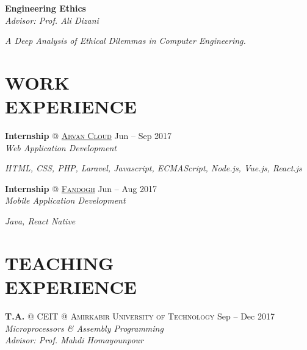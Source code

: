 \documentclass[margin, 10pt]{res} %
\begin{document}
\begin{resume}
\begin{innerlist}
			\end{innerlist}

        \textbf{Engineering Ethics}\\
		\textit{Advisor: Prof. Ali Dizani}
		\begin{innerlist}
			\item \textit{A Deep Analysis of Ethical Dilemmas in Computer Engineering.} \href{https://www.dropbox.com/s/hysshvi811nqwm4/Release_1_0_0.pdf?dl=0}{\hfill\UrlFont[docs]}
			
		\end{innerlist}
		
    
    \section{WORK \\ EXPERIENCE}
	\textbf{Internship} \textsc{@}
	\href{https://www.arvancloud.com/}{\textsc{Arvan Cloud}}
	\hfill {Jun -- Sep 2017}\\
	\textit{Web Application Development}
	\begin{innerlist}
		\item \textit{HTML, CSS, PHP, Laravel, Javascript, ECMAScript, Node.js, Vue.js, React.js}
	\end{innerlist}
	
	\textbf{Internship} \textsc{@}
	\href{http://www.fandogh.org/}{\textsc{Fandogh}}
	\hfill {Jun -- Aug 2017}\\
	\textit{Mobile Application Development}
	\begin{innerlist}
		\item \textit{Java, React Native}
	\end{innerlist}

    
    \section{TEACHING \\ EXPERIENCE} 
    
   \textbf{T.A.} \textsc{@}
   \textsc{CEIT} \textsc{@} \textsc{Amirkabir University of Technology}
   \hfill {Sep -- Dec 2017}\\
   \textit{Microprocessors \& Assembly Programming}\\
   \textit{Advisor: Prof. Mahdi Homayounpour}
   \href{https://github.com/aligholamee/Microprocessors}{\hfill\UrlFont[Resources]}
   

\end{resume}
\end{document}
